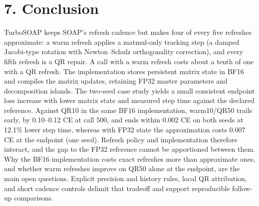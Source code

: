 \hypertarget{conclusion}{%
\section{7. Conclusion}\label{conclusion}}

TurboSOAP keeps SOAP's refresh cadence but makes four of every five
refreshes approximate: a warm refresh applies a matmul-only tracking
step (a damped Jacobi-type rotation with Newton--Schulz orthogonality
correction), and every fifth refresh is a QR repair. A call with a warm
refresh costs about a tenth of one with a QR refresh. The
implementation stores persistent matrix state in BF16 and compiles the
matrix updates, retaining FP32 master parameters and decomposition
islands. The two-seed case study yields a small consistent endpoint loss
increase with lower matrix state and measured step time against the
declared reference. Against QR10 in the same BF16 implementation,
warm10/QR50 trails early, by 0.10--0.12 CE at call 500, and ends within
0.002 CE on both seeds at 12.1\% lower step time, whereas with FP32
state the approximation costs 0.007 CE at the endpoint (one seed).
Refresh policy and implementation therefore interact, and the gap to
the FP32 reference cannot be apportioned between them. Why the BF16
implementation costs exact refreshes more than approximate ones, and
whether warm refreshes improve on QR50 alone at the endpoint, are the
main open questions. Explicit precision and
history rules, local QR attribution, and short cadence controls delimit
that tradeoff and support reproducible follow-up comparisons.

